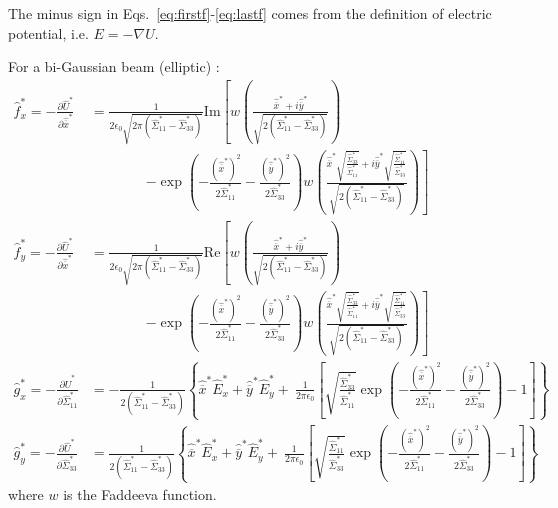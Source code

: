 The minus sign in Eqs.~\ref{eq:firstf}-\ref{eq:lastf} comes from the definition of electric potential, i.e. $E=-\nabla U$.


For a bi-Gaussian beam (elliptic) \cite{hirata}:
\begin{align}
\hat{f}^*_x = -\frac{\partial \hat{U}^*}{\partial \hat{\overline{x}}^*} &= \frac{1}{2 \epsilon_0 \sqrt{2 \pi \left(\hat{\Sigma}^*_{11}-\hat{\Sigma}^*_{33}\right)}} \textrm{Im} \left[w\left(\frac{\hat{\overline{x}}^*+i \hat{\overline{y}}^*}{\sqrt{2 \left(\hat{\Sigma}^*_{11}-\hat{\Sigma}^*_{33}\right)}}\right) \right.
\nonumber \\
&\qquad\qquad\left.
- \exp \left(-\frac{(\hat{\overline{x}}^*)^2}{2\hat{\Sigma}^*_{11}}-\frac{(\hat{\overline{y}}^*)^2}{2\hat{\Sigma}^*_{33}}\right) w\left(\frac{\hat{\overline{x}}^*\sqrt{\frac{\hat{\Sigma}^*_{33}}{\hat{\Sigma}^*_{11}}}+i \hat{\overline{y}}^*\sqrt{\frac{\hat{\Sigma}^*_{11}}{\hat{\Sigma}^*_{33}}}}{\sqrt{2 \left(\hat{\Sigma}^*_{11}-\hat{\Sigma}^*_{33}\right)}}\right)
\right]\\
\hat{f}^*_y  = -\frac{\partial \hat{U}^*}{\partial \hat{\overline{x}}^*} &= \frac{1}{2 \epsilon_0 \sqrt{2 \pi \left(\hat{\Sigma}^*_{11}-\hat{\Sigma}^*_{33}\right)}} \textrm{Re} \left[w\left(\frac{\hat{\overline{x}}^*+i \hat{\overline{y}}^*}{\sqrt{2 \left(\hat{\Sigma}^*_{11}-\hat{\Sigma}^*_{33}\right)}}\right) \right.
\nonumber \\
&\qquad\qquad\left.
- \exp \left(-\frac{(\hat{\overline{x}}^*)^2}{2\hat{\Sigma}^*_{11}}-\frac{(\hat{\overline{y}}^*)^2}{2\hat{\Sigma}^*_{33}}\right) w\left(\frac{\hat{\overline{x}}^*\sqrt{\frac{\hat{\Sigma}^*_{33}}{\hat{\Sigma}^*_{11}}}+i \hat{\overline{y}}^*\sqrt{\frac{\hat{\Sigma}^*_{11}}{\hat{\Sigma}^*_{33}}}}{\sqrt{2 \left(\hat{\Sigma}^*_{11}-\hat{\Sigma}^*_{33}\right)}}\right)
\right]\\
\hat{g}^*_x = -\frac{\partial \hat{U}^*}{\partial \hat{\Sigma}^*_{11}} &= -\frac{1}{2 \left(\hat{\Sigma}^*_{11}-\hat{\Sigma}^*_{33}\right)}
 \left\{\hat{\overline{x}}^* \hat{E}^*_x  + \hat{\overline{y}}^* \hat{E}^*_y +\
 \frac{1}{2 \pi \epsilon_0}\left[\sqrt{\frac{\hat{\Sigma}^*_{33}}{\hat{\Sigma}^*_{11}}}  \exp \left(-\frac{(\hat{\overline{x}}^*)^2}{2\hat{\Sigma}^*_{11}}-\frac{(\hat{\overline{y}}^*)^2}{2\hat{\Sigma}^*_{33}}\right)   -1 \right]\right\}\\
\hat{g}^*_y =  -\frac{\partial \hat{U}^*}{\partial \hat{\Sigma}^*_{33}} &= \frac{1}{2 \left(\hat{\Sigma}^*_{11}-\hat{\Sigma}^*_{33}\right)}
 \left\{\hat{\overline{x}}^* \hat{E}^*_x  + \hat{\overline{y}}^* \hat{E}^*_y +\
 \frac{1}{2 \pi \epsilon_0}\left[\sqrt{\frac{\hat{\Sigma}^*_{11}}{\hat{\Sigma}^*_{33}}}  \exp \left(-\frac{(\hat{\overline{x}}^*)^2}{2\hat{\Sigma}^*_{11}}-\frac{(\hat{\overline{y}}^*)^2}{2\hat{\Sigma}^*_{33}}\right)   -1 \right]\right\}
\end{align}
where $w$ is the Faddeeva function.
 
